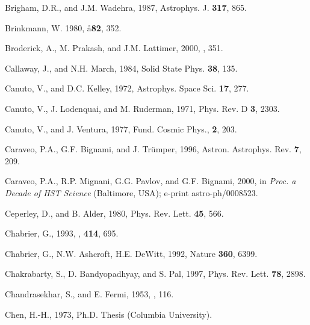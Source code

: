 \begin{references}
\harvarditem{}{}{}
Brigham, D.R., and J.M. Wadehra, 1987, Astrophys. J. {\bf 317}, 865.

\harvarditem{}{}{}
Brinkmann, W. 1980, \aa {\bf 82}, 352.

\harvarditem{}{}{}
Broderick, A., M. Prakash, and J.M. Lattimer, 2000, , 351.

\harvarditem{}{}{}
Callaway, J., and N.H. March, 1984, Solid State Phys. {\bf 38}, 135.


\harvarditem{}{}{}
Canuto, V., and D.C. Kelley, 1972, Astrophys. Space Sci. {\bf 17}, 277. 

\harvarditem{}{}{}
Canuto, V., J. Lodenquai, and M. Ruderman, 1971, 
Phys. Rev. D {\bf 3}, 2303.

\harvarditem{}{}{}
Canuto, V., and J. Ventura, 1977, Fund. Cosmic Phys., {\bf 2}, 203.


\harvarditem{}{}{}
Caraveo, P.A., G.F. Bignami, and J. Tr\"umper, 1996, Astron. Astrophys. Rev.
{\bf 7}, 209.

\harvarditem{}{}{}
Caraveo, P.A., R.P. Mignani, G.G. Pavlov, and G.F. Bignami, 2000, 
in {\it Proc. a Decade of HST Science}
(Baltimore, USA); e-print astro-ph/0008523.

\harvarditem{}{}{}
Ceperley, D., and B. Alder, 1980, Phys. Rev. Lett. {\bf 45}, 566.

\harvarditem{}{}{}
Chabrier, G., 1993, \apj, {\bf 414}, 695.

\harvarditem{}{}{}
Chabrier, G., N.W. Ashcroft, H.E. DeWitt, 1992, Nature {\bf 360}, 6399.

\harvarditem{}{}{}
Chakrabarty, S., D. Bandyopadhyay, and S. Pal, 1997, 
Phys. Rev. Lett. {\bf 78}, 2898.

\harvarditem{}{}{}
Chandrasekhar, S., and E. Fermi, 1953, , 116.

\harvarditem{}{}{}
Chen, H.-H., 1973, Ph.D. Thesis (Columbia University).


\end{references}
